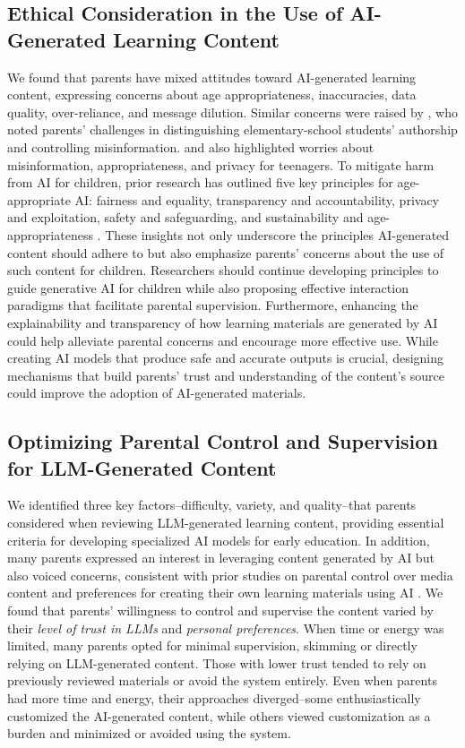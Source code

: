 \subsection{Ethical Consideration in the Use of AI-Generated Learning Content}\label{sec-dis-2}
We found that parents have mixed attitudes toward AI-generated learning content, expressing concerns about age appropriateness, inaccuracies, data quality, over-reliance, and message dilution. Similar concerns were raised by \citet{han2024teachers}, who noted parents' challenges in distinguishing elementary-school students' authorship and controlling misinformation. \citet{yu2024exploring} and \citet{ho2024s} also highlighted worries about misinformation, appropriateness, and privacy for teenagers. To mitigate harm from AI for children, prior research has outlined five key principles for age-appropriate AI: fairness and equality, transparency and accountability, privacy and exploitation, safety and safeguarding, and sustainability and age-appropriateness \cite{wang2022informing}. These insights not only underscore the principles AI-generated content should adhere to but also emphasize parents' concerns about the use of such content for children. Researchers should continue developing principles to guide generative AI for children while also proposing effective interaction paradigms that facilitate parental supervision. Furthermore, enhancing the explainability and transparency of how learning materials are generated by AI could help alleviate parental concerns and encourage more effective use. While creating AI models that produce safe and accurate outputs is crucial, designing mechanisms that build parents' trust and understanding of the content's source could improve the adoption of AI-generated materials.

\subsection{Optimizing Parental Control and Supervision for LLM-Generated Content}
We identified three key factors--difficulty, variety, and quality--that parents considered when reviewing LLM-generated learning content, providing essential criteria for developing specialized AI models for early education. In addition, many parents expressed an interest in leveraging content generated by AI but also voiced concerns, consistent with prior studies on parental control over media content \cite{yu2024parent, ho2024s} and preferences for creating their own learning materials using AI \cite{han2024teachers}. We found that parents' willingness to control and supervise the content varied by their \textit{level of trust in LLMs} and \textit{personal preferences}. When time or energy was limited, many parents opted for minimal supervision, skimming or directly relying on LLM-generated content. Those with lower trust tended to rely on previously reviewed materials or avoid the system entirely. Even when parents had more time and energy, their approaches diverged--some enthusiastically customized the AI-generated content, while others viewed customization as a burden and minimized or avoided using the system.

